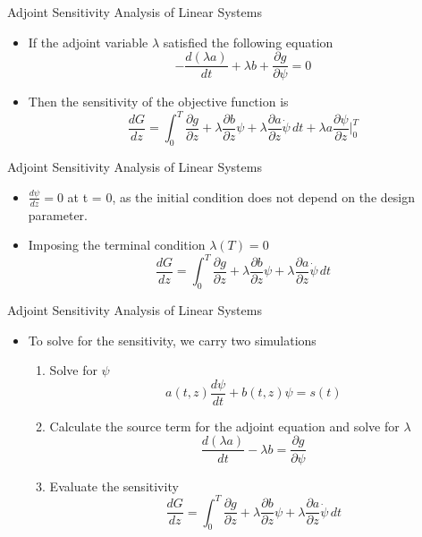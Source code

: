 \documentclass[10pt]{beamer}
\begin{document}
\begin{frame}{Adjoint Sensitivity Analysis of Linear Systems}
	\begin{itemize}
		\item If the adjoint variable $\lambda$  satisfied the following equation 
		\begin{equation}
-   \frac{d(\lambda a)}{dt} +  \lambda b +  \frac{\partial g}{\partial \psi} = 0
		\end{equation}  
		\item Then the sensitivity of the objective function is 
	\begin{dmath}
		\frac{dG}{dz} = \int^T_0 \frac{\partial g}{\partial z}
		+ \lambda \frac{\partial b}{\partial z} \psi + \lambda \frac{\partial a}{\partial z} \dot{\psi}  \, dt + \lambda a \frac{\partial \psi}{\partial z} |^T_0 
	\end{dmath} 
	\end{itemize}
\end{frame}

\begin{frame}{Adjoint Sensitivity Analysis of Linear Systems}
	\begin{itemize}
		\item $\frac{d \psi}{dz} = 0$ at t = 0, as the initial condition does not depend on the design parameter. 
		\item Imposing the terminal condition $\lambda(T) = 0$
		\begin{dmath}
			\frac{dG}{dz} = \int^T_0 \frac{\partial g}{\partial z}
			+ \lambda \frac{\partial b}{\partial z} \psi + \lambda \frac{\partial a}{\partial z} \dot{\psi}  \, dt
		\end{dmath} 
	\end{itemize}
\end{frame}

\begin{frame}{Adjoint Sensitivity Analysis of Linear Systems}
	\begin{itemize}
		\item To solve for the sensitivity, we carry two simulations  \begin{enumerate}
			\item Solve for $\psi$   
				\begin{equation*}
				a(t,z)\frac{d \psi}{dt} +b(t,z) \psi = s(t) 
				\end{equation*}
			\item Calculate the source term for the adjoint equation and solve for $\lambda$	
					\begin{equation*}
					   \frac{d(\lambda a)}{dt}   -\lambda b   =  \frac{\partial g}{\partial \psi}
					\end{equation*} 
			\item Evaluate the sensitivity 
				\begin{equation*}
					\frac{dG}{dz} = \int^T_0 \frac{\partial g}{\partial z}
					+ \lambda \frac{\partial b}{\partial z} \psi + \lambda \frac{\partial a}{\partial z} \dot{\psi}  \, dt
				\end{equation*}		 
		\end{enumerate}
	\end{itemize}
\end{frame}
\end{document}
